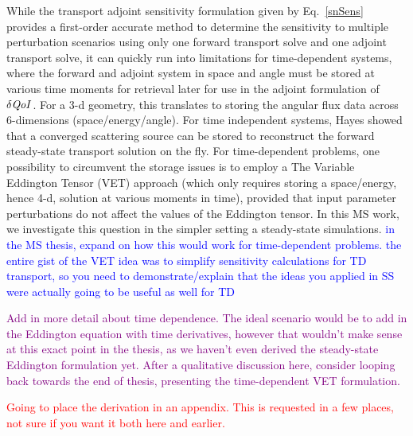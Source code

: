 \documentclass[12pt]{report}
\newcommand{\qoi}{{\it QoI}\xspace}
\newcommand{\comment}[2]{\marginpar{\textcolor{#2}{$\star$}}\textcolor{#2}{#1}\newline}
\newcommand{\iwh}[1]{\comment{#1}{red}}
\newcommand{\jcr}[1]{\comment{#1}{blue}}
\newcommand{\todo}[1]{\comment{#1}{purple}}
\newcommand{\iwh}[1]{\phantom{a}}
\newcommand{\jcr}[1]{\phantom{a}}
\newcommand{\todo}[1]{\phantom{a}}
\begin{document}
While the transport adjoint sensitivity formulation given by Eq.~\eqref{snSens} provides a first-order accurate method to determine the sensitivity to multiple perturbation scenarios using only one forward transport solve and one adjoint transport solve, it can quickly run into limitations for time-dependent systems, where the forward and adjoint system in space and angle must be stored at various time moments for retrieval later for use in the adjoint formulation of $\delta \qoi$. For a 3-d geometry, this translates to storing the angular
flux data across 6-dimensions (space/energy/angle). For time independent systems, Hayes \cite{Stripling} showed that a converged scattering source can be stored to reconstruct 
the forward steady-state transport solution on the fly. For time-dependent problems, one possibility to circumvent the storage issues is to employ a The Variable Eddington Tensor (VET) approach (which only requires
storing a space/energy, hence 4-d, solution at various moments in time), provided that input parameter perturbations do not affect the values of the Eddington tensor. In this MS work,
we investigate this question in the simpler setting a steady-state simulations.
\jcr{in the MS thesis, expand on how this would work for time-dependent problems. the entire
gist of the VET idea was to simplify sensitivity calculations for TD transport, so you need
to demonstrate/explain that the ideas you applied in SS were actually going to be useful as well for TD}

\todo{Add in more detail about time dependence. The ideal scenario would be to add in the Eddington equation with time derivatives, however that wouldn't make sense at this exact point in the thesis, as we haven't even derived the steady-state Eddington formulation yet. After a qualitative discussion here, consider looping back towards the end of thesis, presenting the time-dependent VET formulation.}

\iwh{Going to place the derivation in an appendix. This is requested in a few places, not sure if you want it both here and earlier.}

\end{document}
